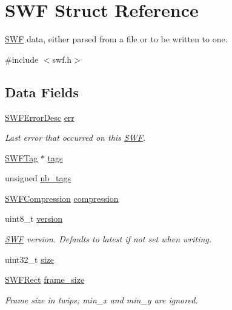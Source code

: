 \hypertarget{struct_s_w_f}{}\section{S\+W\+F Struct Reference}
\label{struct_s_w_f}


\hyperlink{struct_s_w_f}{S\+W\+F} data, either parsed from a file or to be written to one.  




{\ttfamily \#include $<$swf.\+h$>$}

\subsection*{Data Fields}
\begin{DoxyCompactItemize}
\item 
\hyperlink{struct_s_w_f_error_desc}{S\+W\+F\+Error\+Desc} \hyperlink{struct_s_w_f_afd3f84db8c0aa52bd4923cb23f81ea0b}{err}
\begin{DoxyCompactList}\small\item\em Last error that occurred on this \hyperlink{struct_s_w_f}{S\+W\+F}. \end{DoxyCompactList}\item 
\hyperlink{struct_s_w_f_tag}{S\+W\+F\+Tag} $\ast$ \hyperlink{struct_s_w_f_a27238e7bdf4bb8961159b4c4a8913580}{tags}
\item 
unsigned \hyperlink{struct_s_w_f_ae9a2ba32a4a650ec76d45cc5211f77b0}{nb\+\_\+tags}
\item 
\hyperlink{swf_8h_ab2a10479850ea02b88a9da760188f9e8}{S\+W\+F\+Compression} \hyperlink{struct_s_w_f_a6431142bed21f16383a18d8a3f8a19d1}{compression}
\item 
uint8\+\_\+t \hyperlink{struct_s_w_f_aafcab8c367361cc18461b683b9278ad0}{version}
\begin{DoxyCompactList}\small\item\em \hyperlink{struct_s_w_f}{S\+W\+F} version. Defaults to latest if not set when writing. \end{DoxyCompactList}\item 
uint32\+\_\+t \hyperlink{struct_s_w_f_a5e4ec5c09472acb241a3122606d833b2}{size}
\item 
\hyperlink{struct_s_w_f_rect}{S\+W\+F\+Rect} \hyperlink{struct_s_w_f_afba7a69a7d2cd1fff8fcfd7ed2007c96}{frame\+\_\+size}
\begin{DoxyCompactList}\small\item\em Frame size in twips; min\+\_\+x and min\+\_\+y are ignored. \end{DoxyCompactList}\item 

\end{DoxyCompactItemize}
